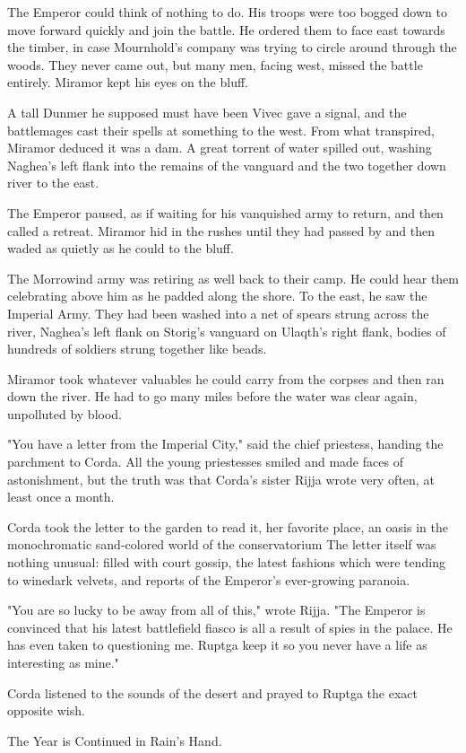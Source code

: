 The Emperor could think of nothing to do. His troops were too bogged down to move forward quickly and join the battle. He ordered them to face east towards the timber, in case Mournhold's company was trying to circle around through the woods. They never came out, but many men, facing west, missed the battle entirely. Miramor kept his eyes on the bluff.

A tall Dunmer he supposed must have been Vivec gave a signal, and the battlemages cast their spells at something to the west. From what transpired, Miramor deduced it was a dam. A great torrent of water spilled out, washing Naghea's left flank into the remains of the vanguard and the two together down river to the east.

The Emperor paused, as if waiting for his vanquished army to return, and then called a retreat. Miramor hid in the rushes until they had passed by and then waded as quietly as he could to the bluff.

The Morrowind army was retiring as well back to their camp. He could hear them celebrating above him as he padded along the shore. To the east, he saw the Imperial Army. They had been washed into a net of spears strung across the river, Naghea's left flank on Storig's vanguard on Ulaqth's right flank, bodies of hundreds of soldiers strung together like beads.

Miramor took whatever valuables he could carry from the corpses and then ran down the river. He had to go many miles before the water was clear again, unpolluted by blood.

"You have a letter from the Imperial City," said the chief priestess, handing the parchment to Corda. All the young priestesses smiled and made faces of astonishment, but the truth was that Corda's sister Rijja wrote very often, at least once a month.

Corda took the letter to the garden to read it, her favorite place, an oasis in the monochromatic sand-colored world of the conservatorium The letter itself was nothing unusual: filled with court gossip, the latest fashions which were tending to winedark velvets, and reports of the Emperor's ever-growing paranoia.

"You are so lucky to be away from all of this," wrote Rijja. "The Emperor is convinced that his latest battlefield fiasco is all a result of spies in the palace. He has even taken to questioning me. Ruptga keep it so you never have a life as interesting as mine."

Corda listened to the sounds of the desert and prayed to Ruptga the exact opposite wish.

The Year is Continued in Rain's Hand.